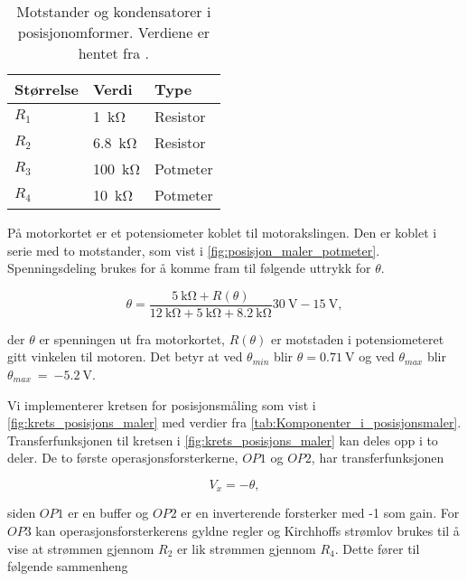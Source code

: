 \begin{table}[h!]
    \centering
    \caption{Motstander og kondensatorer i posisjonomformer. Verdiene er hentet fra \cite{AnalogMotorlabbOppgaver}.}
    \begin{tabular}{lll}
        \toprule
        Størrelse & Verdi & Type \\
		\midrule
        $R_1$ & \SI{1}{\kilo\ohm} & Resistor\\
        $R_2$ & \SI{6.8}{\kilo\ohm} & Resistor \\
        $R_3$ & \SI{100}{\kilo\ohm} & Potmeter \\
        $R_4$ & \SI{10}{\kilo\ohm} & Potmeter \\
        \bottomrule
    \end{tabular}
    \label{tab:Komponenter_i_posisjonsmaler}
\end{table}

På motorkortet er et potensiometer koblet til motorakslingen. Den er koblet i serie med to motstander, som vist i \autoref{fig:posisjon_maler_potmeter}. Spenningsdeling brukes for å komme fram til følgende uttrykk for $\theta$.

\begin{equation}
    \label{eq:V_av_theta}
    \theta = \frac{\SI{5}{\kilo\ohm} + R(\theta)}{\SI{12}{\kilo\ohm} + \SI{5}{\kilo\ohm} + \SI{8.2}{\kilo\ohm}} \SI{30}{\volt} - \SI{15}{\volt},
\end{equation}

der $\theta$ er spenningen ut fra motorkortet, $R(\theta)$ er motstaden i potensiometeret gitt vinkelen til motoren. Det betyr at ved $\theta_{min}$ blir $\theta = \SI{0.71}{\volt}$ og ved $\theta_{max}$ blir $\theta_{max}~=~\SI{-5.2}{\volt}$.

Vi implementerer kretsen for posisjonsmåling som vist i \autoref{fig:krets_posisjons_maler} med verdier fra \autoref{tab:Komponenter_i_posisjonsmaler}.
Transferfunksjonen til kretsen i \autoref{fig:krets_posisjons_maler} kan deles opp i to deler. De to første operasjonsforsterkerne, $OP1$ og $OP2$, har transferfunksjonen

\begin{equation}
    \label{eq:posisjon_maler_deltransferfunksjon}
    V_x = -\theta,
\end{equation}

siden $OP1$ er en buffer og $OP2$ er en inverterende forsterker med -1 som gain.
For $OP3$ kan operasjonsforsterkerens gyldne regler og Kirchhoffs strømlov brukes til å vise at strømmen gjennom $R_2$ er lik strømmen gjennom $R_4$. Dette fører til følgende sammenheng

